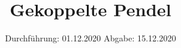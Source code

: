 

\subject{106}
\title{Gekoppelte Pendel}
\date{%
  Durchführung: 01.12.2020
  \hspace{3em}
  Abgabe: 15.12.2020
}



\maketitle
\thispagestyle{empty}
\tableofcontents
\newpage







\printbibliography{}


